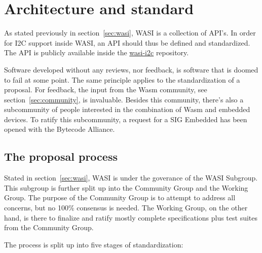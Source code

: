 \chapter{Architecture and standard}
\label{chap:architecture}

As stated previously in section~\ref{sec:wasi}, \gls{WASI} is a collection of \gls{API}'s. In order for \gls{I2C} support inside \gls{WASI}, an \gls{API} should thus be defined and standardized. The \gls{API} is publicly available inside the \href{https://github.com/WebAssembly/wasi-i2c}{wasi-i2c} repository.

Software developed without any reviews, nor feedback, is software that is doomed to fail at some point. The same principle applies to the standardization of a proposal. For feedback, the input from the \gls{Wasm} community, see section~\ref{sec:community}, is invaluable. Besides this community, there's also a subcommunity of people interested in the combination of \gls{Wasm} and embedded devices. To ratify this subcommunity, a request for a \gls{SIG} Embedded has been opened with the Bytecode Alliance.

\section{The proposal process}

Stated in section~\ref{sec:wasi}, \gls{WASI} is under the goverance of the \gls{WASI} Subgroup. This subgroup is further split up into the Community Group and the Working Group. The purpose of the Community Group is to attempt to address all concerns, but no 100\% consensus is needed. The Working Group, on the other hand, is there to finalize and ratify mostly complete specifications plus test suites from the Community Group.


The process is split up into five stages of standardization:


